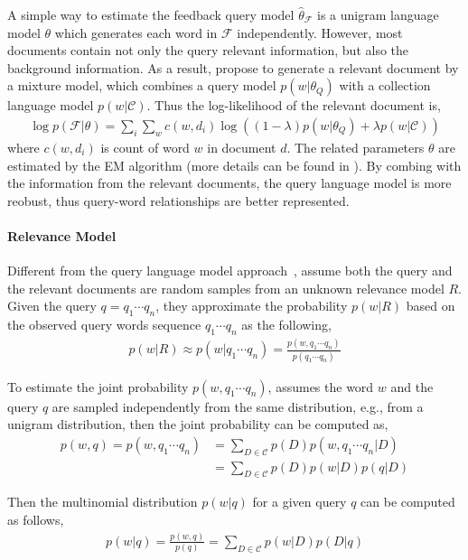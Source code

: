 A simple way to estimate the feedback query model $\hat{\theta}_{\mathcal{F}}$ is a unigram language model $\theta$ which generates each word in $\mathcal{F}$ independently. However, most documents contain not only the query relevant information, but also the background information. As a result, \cite{zhai-01b} propose to generate a relevant document by a mixture model, which combines a query model $p(w|\theta_Q)$ with a collection language model $p(w|\mathcal{C})$. Thus the log-likelihood of the relevant document is,
\begin{align}
\log p(\mathcal{F}|\theta) = \sum_i \sum_w c(w, d_i) \log((1-\lambda)p(w|\theta_Q) + \lambda p(w|\mathcal{C}))
\end{align}
where $c(w, d_i)$ is count of word $w$ in document $d$. The related parameters $\theta$ are estimated by the EM algorithm (more details can be found in \cite{zhai-01b}). By combing with the information from the relevant documents, the query language model is more reobust, thus query-word relationships are better represented. 

\paragraph{Relevance Model}

Different from the query language model approach~\citep{zhai-01b}, \cite{Lavrenko-2001} assume both the query and the relevant documents are random samples from an unknown relevance model $R$. Given the query $q = q_1 \cdots q_n$, they approximate the probability $p(w|R)$ based on the observed query words sequence $q_1 \cdots q_n$ as the following,
\begin{align}
p(w|R) \approx p(w|q_1 \cdots q_n) = \frac{p(w,q_1 \cdots q_n)}{p(q_1 \cdots q_n)}
\end{align}

To estimate the joint probability $p(w,q_1 \cdots q_n)$, \cite{Lavrenko-2001} assumes the word $w$ and the query $q$ are sampled independently from the same distribution, e.g., from a unigram distribution, then the joint probability can be computed as,
\begin{align}
p(w, q) = p(w,q_1 \cdots q_n) &= \sum_{D \in \mathcal{C}} p(D) p(w,q_1 \cdots q_n | D) \\
&= \sum_{D \in \mathcal{C}} p(D) p(w|D) p(q | D)
\end{align}

Then the multinomial distribution $p(w|q)$ for a given query $q$ can be computed as follows,
\begin{align}
\label{eq:rm_qe}
p(w|q) = \frac{p(w, q)}{p(q)} = \sum_{D \in \mathcal{C}} p(w|D) p(D|q)
\end{align}

